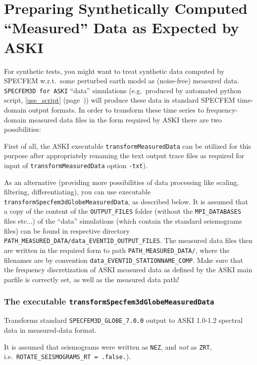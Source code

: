 \documentclass[12pt,a4paper]{article}
\newcommand{\lcode}[1]{\nolinkurl{#1}}
\newcommand{\ASKI}{ {\ttfamily ASKI} }
\newcommand{\myref}[1]{\ref{#1} (page~\pageref{#1})}
\begin{document}
\section{Preparing Synthetically Computed ``Measured'' Data as Expected by \ASKI{}} \label{transform_measured}
%
For synthetic tests, you might want to treat synthetic data computed by SPECFEM w.r.t.\ some perturbed earth model
as (noise-free) measured data. \lcode{SPECFEM3D for ASKI} ``data'' simulations (e.g.\ produced by automated 
python script, \myref{use_script}) will produce these data in standard SPECFEM time-domain output formats. 
In order to transform these time series to frequency-domain measured data files in the form required by \ASKI{}
there are two possibilities: 

First of all, the \ASKI{} executable \lcode{transformMeasuredData} can be utilized
for this purpose after appropriately renaming the text output 
trace files as required for input of \lcode{transformMeasuredData} option \lcode{-txt}).

As an alternative (providing more possibilities of data processing like scaling, filtering, differentiating),
you can use executable \lcode{transformSpecfem3dGlobeMeasuredData}, as described below.
It is assumed that a copy of the content of the \lcode{OUTPUT_FILES} folder 
(without the \lcode{MPI_DATABASES} files etc...)
of the ``data'' simulations (which contain the standard seismograms files) can be found in respective
directory \lcode{PATH_MEASURED_DATA/data_EVENTID_OUTPUT_FILES}. 
The measured data files then are written in the required form to path \lcode{PATH_MEASURED_DATA/}, where the filenames are by
convention \lcode{data_EVENTID_STATIONNAME_COMP}. 
Make sure that the frequency discretization of \ASKI{} measured data as defined by the \ASKI{} main parfile 
is correctly set, as well as the measured data path!

\subsubsection*{The executable \lcode{transformSpecfem3dGlobeMeasuredData}}
Transforms standard \lcode{SPECFEM3D_GLOBE_7.0.0} output to \ASKI{} 1.0-1.2 spectral data in measured-data 
format.

It is assumed that seismograms were written as \lcode{NEZ}, and \emph{not} as \lcode{ZRT},
i.e.\ \lcode{ROTATE_SEISMOGRAMS_RT = .false.}). 
\end{document}
